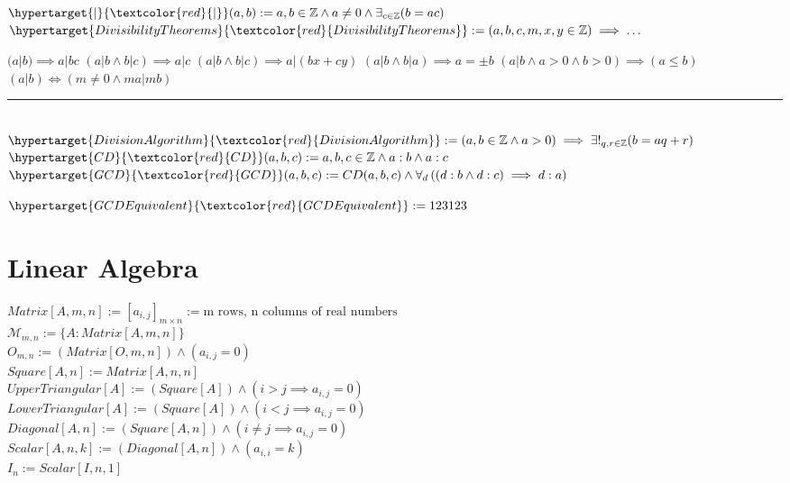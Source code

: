 \documentclass{book}
\newcommand{\df}[1]{\hypertarget{#1}{\textcolor{red}{#1}}}
\newcommand{\abr}{:=}
\newcommand{\pr}[1]{\left(#1\right)}
\begin{document}
$\df{|}(a, b) \abr a, b \in \mathbb{Z} \land a \neq 0 \land \exists_{c \in \mathbb{Z}}(b = a c)$ \\

$\df{Divisibility Theorems} \abr (a, b, c, m, x, y \in \mathbb{Z}) \implies \ldots$
\begin{enumerate}
  \lit $(a | b) \implies a | b c$
  \lit $(a | b \land b | c) \implies a | c$
  \lit $(a | b \land b | c) \implies a | (b x + c y)$
  \lit $(a | b \land b | a) \implies a = \pm b$
  \lit $(a | b \land a > 0 \land b > 0) \implies (a \leq b)$
  \lit $(a | b) \iff (m \neq 0 \land m a | m b)$
\end{enumerate} \vspace{.75mm} \hrule \vspace{.75mm} \ \\ 

$\df{Division Algorithm} \abr (a, b \in \mathbb{Z} \land a > 0) \implies \exists!_{q, r \in \mathbb{Z}}(b = a q + r)$ \\

$\df{CD}(a, b, c) \abr a, b, c \in \mathbb{Z} \land a : b \land a : c$ \\
$\df{GCD}(a, b, c) \abr CD(a, b, c) \land \forall_{d}\pr{(d : b \land d : c) \implies d : a}$

$\df{GCD Equivalent} \abr 123123$

\chapter{Linear Algebra}

$Matrix[A, m, n] \abr [a_{i, j}]_{m \times n} \abr \text{m rows, n columns of real numbers}$ \\
$\mathcal{M}_{m, n} \abr \{A : Matrix[A, m, n]\}$ \\
$O_{m, n} \abr (Matrix[O, m, n]) \land (a_{i, j} = 0)$ \\
$Square[A, n] \abr Matrix[A, n, n]$ \\
$UpperTriangular[A] \abr (Square[A]) \land (i > j \implies a_{i, j} = 0)$ \\
$LowerTriangular[A] \abr (Square[A]) \land (i < j \implies a_{i, j} = 0)$ \\
$Diagonal[A, n] \abr (Square[A, n]) \land (i \neq j \implies a_{i, j} = 0)$ \\
$Scalar[A, n, k] \abr (Diagonal[A, n]) \land (a_{i, i} = k)$ \\
$I_n \abr Scalar[I, n, 1]$ \\
\end{document}
